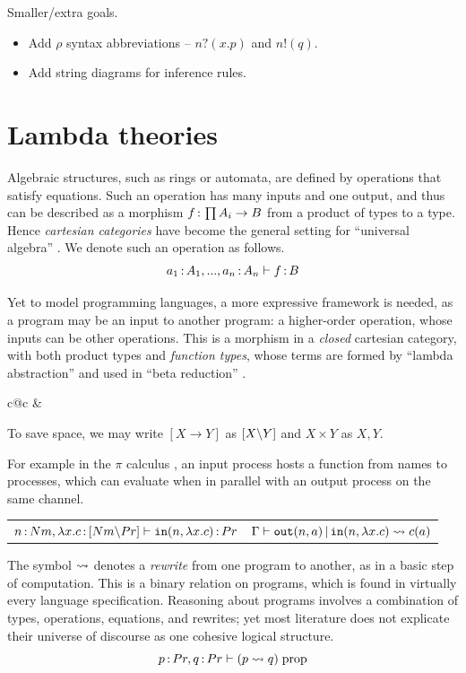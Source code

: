 \documentclass{article}
\begin{document}
\vspace{5em}

Smaller/extra goals.

\begin{itemize}
    \item Add $\rho$ syntax abbreviations -- $n?(x.p)$ and $n!(q)$.
    \item Add string diagrams for inference rules.
\end{itemize}

\newpage

\section{Lambda theories}

Algebraic structures, such as rings or automata, are defined by operations that satisfy equations. Such an operation has many inputs and one output, and thus can be described as a morphism $f\,{:}\, \prod A_i\to B$ from a product of types to a type. Hence \textit{cartesian categories} have become the general setting for ``universal algebra'' \cite{algthy}. We denote such an operation as follows.
\[a_1\,{:}\, A_1, ..., a_n\,{:}\, A_n\vdash f\,{:}\, B\]

Yet to model programming languages, a more expressive framework is needed, as a program may be an input to another program: a higher-order operation, whose inputs can be other operations. This is a morphism in a \textit{closed} cartesian category, with both product types and \textit{function types}, whose terms are formed by ``lambda abstraction'' and used in ``beta reduction'' \cite{ccc}.
\begin{center}
    \begin{tabular}{c@{\qquad\qquad}c}
          &
    \end{tabular}
\end{center}
To save space, we may write $[X\to Y]$ as $[X{\setminus} Y]$ and $X\times Y$ as $X,Y$.

For example in the $\pi$ calculus \cite{pi}, an input process hosts a function from names to processes, which can evaluate when in parallel with an output process on the same channel.
\begin{center}
    \begin{tabular}{c@{\qquad\qquad}c}
         $n\,{:}\, Nm, \lambda x.c\,{:}\, [Nm{\setminus} Pr] \vdash \mathtt{in}(n,\lambda x.c)\,{:}\, Pr$ &
         $\Gamma\vdash \mathtt{out}(n,a)\,|\, \mathtt{in}(n,\lambda x.c)\rightsquigarrow c(a)$
    \end{tabular}
\end{center}
The symbol $\rightsquigarrow$ denotes a \textit{rewrite} from one program to another, as in a basic step of computation. This is a binary relation on programs, which is found in virtually every language specification. Reasoning about programs involves a combination of types, operations, equations, and rewrites; yet most literature does not explicate their universe of discourse as one cohesive logical structure.
\[p\,{:}\, Pr, q\,{:}\, Pr\vdash (p\rightsquigarrow q)\; \mathrm{prop}\]
\end{document}

